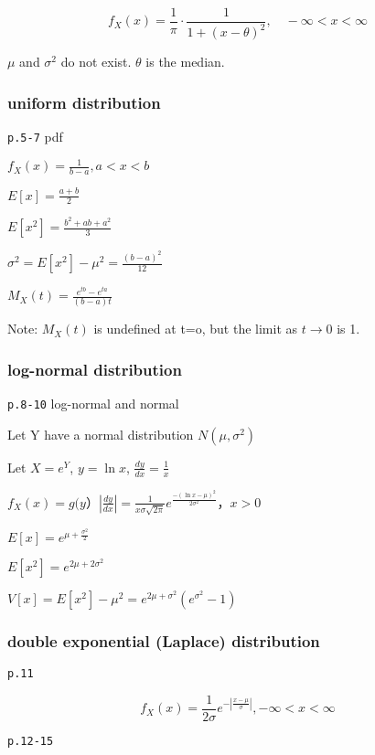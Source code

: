 \documentclass[]{tufte-book}
\begin{document}
\[f_X(x)=\frac1\pi\cdot\frac1{1+(x-\theta)^2},\quad -\infty<x<\infty\]

\(\mu\) and \(\sigma^2\) do not exist. \(\theta\) is the median.

\hypertarget{uniform-distribution}{%
\subsubsection{uniform distribution}\label{uniform-distribution}}

\texttt{p.5-7} pdf

\(f_X(x)=\frac1{b-a}, a<x<b\)

\(E[x]=\frac{a+b}{2}\)

\(E[x^2]=\frac{b^2+ab+a^2}{3}\)

\(\sigma^2=E[x^2]-\mu^2=\frac{(b-a)^2}{12}\)

\(M_X(t)=\frac{e^{tb}-e^{ta}}{(b-a)t}\)

Note: \(M_X(t)\) is undefined at t=o, but the limit as \(t\rightarrow0\)
is 1.

\hypertarget{log-normal-distribution}{%
\subsubsection{log-normal distribution}\label{log-normal-distribution}}

\texttt{p.8-10} log-normal and normal

Let Y have a normal distribution \(N(\mu,\sigma^2)\)

Let \(X=e^Y\), \(y=\ln x\), \(\frac{dy}{dx}=\frac1x\)

\(f_X(x)=g(y）|\frac{dy}{dx}|=\frac{1}{x\sigma \sqrt{2\pi}}e^{\frac{-(\ln x-\mu)^2}{2\sigma^2}}， x>0\)

\(E[x]=e^{\mu+\frac{\sigma^2}2}\)

\(E[x^2]=e^{2\mu+2\sigma^2}\)

\(V[x]=E[x^2]-\mu^2=e^{2\mu+\sigma^2}(e^{\sigma^2}-1)\)

\hypertarget{double-exponential-laplace-distribution}{%
\subsubsection{double exponential (Laplace)
distribution}\label{double-exponential-laplace-distribution}}

\texttt{p.11}

\[f_X(x)=\frac{1}{2\sigma} e^{-|\frac{x-\mu}{\sigma}|}, -\infty<x<\infty\]

\texttt{p.12-15}
\end{document}
